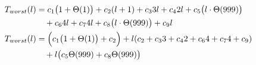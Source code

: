 \begin{subequations}
\label{eq:extendlinesinpool}
\begin{align}
\label{eq:extendlinesinpool-1}
T_{worst}(l)& =
c_{1}\bigl(1 + \Theta(1)\bigr)
+ c_{2}(l+1)
+ c_{3}3l
+ c_{4}2l
+ c_{5}\bigl(l \cdot \Theta(999)\bigr)
\\
& \quad
+ c_{6}4l
+ c_{7}4l
+ c_{8}\bigl(l \cdot \Theta(999)\bigr)
+ c_{9}l
\nonumber \\
\label{eq:extendlinesinpool-2}
T_{worst}(l)& =
\Bigl(c_{1}\bigl(1 + \Theta(1)\bigr) + c_{2}\Bigr)
+ l(c_{2} + c_{3}3 + c_{4}2 + c_{6}4 + c_{7}4 + c_{9})
\\
& \quad
+ l\bigl(c_{5}\Theta(999) + c_{8}\Theta(999)\bigr)
\nonumber
\end{align}
\end{subequations}
